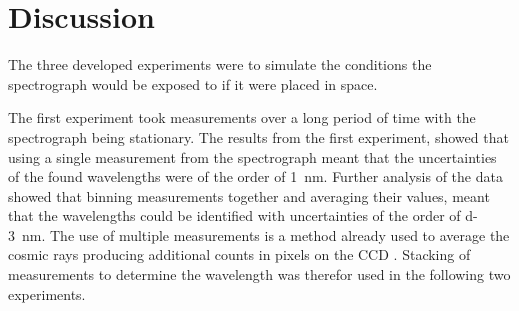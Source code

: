 \chapter{Discussion}

The three developed experiments were to simulate the conditions the spectrograph would be exposed to if it were placed in space. 

The first experiment took measurements over a long period of time with the spectrograph being stationary. The results from the first experiment, showed that using a single measurement from the spectrograph meant that the uncertainties of the found wavelengths were of the order of \SI{1}{\nano\meter}. Further analysis of the data showed that binning measurements together and averaging their values, meant that the wavelengths could be identified with uncertainties of the order of \SI{d-3}{\nano\meter}. The use of multiple measurements is a method already used to average the cosmic rays producing additional counts in pixels on the CCD \citep{Mons}. Stacking of measurements to determine the wavelength was therefor used in the following two experiments. 

